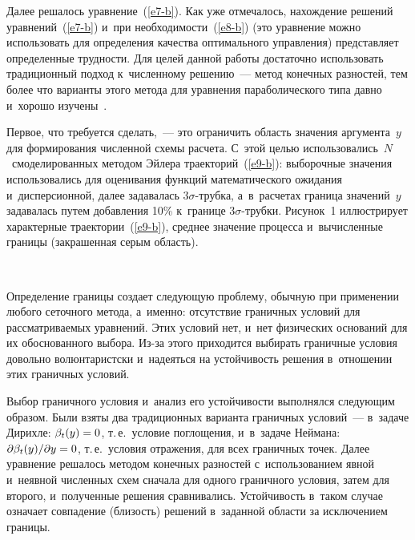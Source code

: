 \begin{multicols}{2}
     Далее решалось уравнение~(\ref{e7-b}). Как уже отмечалось, 
нахождение решений уравнений~(\ref{e7-b}) и~при  
необходимости~(\ref{e8-b}) (это уравнение можно использовать для 
определения качества оптимального управ\-ле\-ния) пред\-став\-ля\-ет 
определенные труд\-но\-сти. Для целей данной работы достаточно использовать 
традиционный подход к~чис\-лен\-но\-му решению~--- метод конечных 
разностей, тем более что варианты этого метода для урав\-не\-ния 
параболического типа дав\-но и~хорошо изучены~\cite{6-b}.
     
     Первое, что требуется сделать,~--- это ограничить область значения 
аргумента~$y$ для формирования численной схемы расчета. С~этой целью 
использовались~$N$~смоделированных методом Эйлера 
траекторий~(\ref{e9-b}): выборочные значения использовались для 
оценивания функций математического ожидания и~дисперсионной, далее 
задавалась  
$3\sigma$-труб\-ка, а~в~расчетах граница значений~$y$ задавалась путем 
добавления 10\% к~границе $3\sigma$-труб\-ки. Рисунок~1 иллюстрирует 
характерные траектории~(\ref{e9-b}), среднее значение процесса 
и~вычисленные границы (закрашенная серым область).

\begin{figure*} %
\vspace*{1pt}
 \begin{center}  
  \mbox{%
 \epsfxsize=163mm 
 }
\end{center}
\vspace*{-11pt}
\end{figure*}

     Определение границы создает следующую проб\-ле\-му, обычную при 
применении любого сеточного метода, а~именно: отсутствие граничных 
условий для рассматриваемых уравнений. Этих условий нет, и~нет 
физических оснований для их обоснованного выбора. Из-за этого приходится 
выбирать граничные условия довольно волюнтаристски и~надеяться на 
устойчивость решения в~отношении этих граничных условий. 

Выбор 
граничного условия и~анализ его устойчивости выполнялся следующим 
образом. Были взяты два традиционных варианта граничных условий~--- 
в~задаче Дирихле: $\beta_t(y)\hm=0$, т.\,е.\ условие поглощения, и~в~задаче 
Неймана: $\partial \beta_t(y)/\partial y\hm=0$, т.\,е.\ условия отражения, для 
всех граничных точек. Далее уравнение решалось методом конечных 
разностей с~использованием явной и~неявной численных схем сначала для 
одного граничного условия, затем для второго, и~полученные решения 
сравнивались. Устойчивость в~таком случае означает совпадение (близость) 
решений в~заданной области за исключением границы.
     

\end{multicols}
